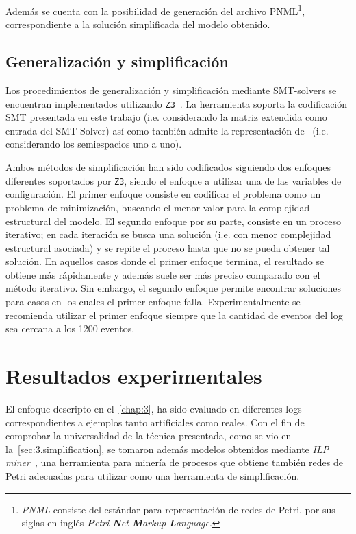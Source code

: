 Además se cuenta con la posibilidad de generación del archivo PNML\footnote{\textit{PNML} consiste del estándar para representación
de redes de Petri, por sus siglas en inglés \textit{\textbf{P}etri \textbf{N}et \textbf{M}arkup \textbf{L}anguage}.},
correspondiente a la solución simplificada del modelo obtenido.

\subsection{Generalización y simplificación}
\label{sec:4.simplification}

Los procedimientos de generalización y simplificación mediante SMT-solvers se encuentran implementados utilizando \texttt{Z3}~\cite{MouraB08}. 
La herramienta soporta la codificación SMT presentada en este trabajo (i.e. considerando la matriz extendida
como entrada del SMT-Solver) así como también admite la representación de~\cite{LeonCB15} (i.e. considerando los semiespacios uno a uno).

Ambos métodos de simplificación han sido codificados siguiendo dos enfoques diferentes soportados por \texttt{Z3},
siendo el enfoque a utilizar una de las variables de configuración.
El primer enfoque consiste en codificar el problema como un problema de minimización, buscando 
el menor valor para la complejidad estructural del modelo.
El segundo enfoque por su parte, consiste en un proceso iterativo; en cada iteración se busca
una  solución (i.e. con menor complejidad estructural asociada) y se repite el proceso
hasta que no se pueda obtener tal solución.
En aquellos casos donde el primer enfoque termina, el resultado se obtiene más rápidamente y además 
suele ser más preciso comparado con el método iterativo. Sin embargo, el segundo enfoque
permite encontrar soluciones para casos en los cuales el primer enfoque falla.
Experimentalmente se recomienda utilizar el primer enfoque siempre que la cantidad de eventos del log
sea cercana a los 1200 eventos.

\section{Resultados experimentales}
\label{sec:4.experiments}

El enfoque descripto en el~\autoref{chap:3}, ha sido evaluado en diferentes logs correspondientes
a ejemplos tanto artificiales como reales. Con el fin de comprobar la universalidad de la técnica presentada,
como se vio en la~\autoref{sec:3.simplification}, se tomaron además modelos obtenidos mediante \textit{ILP miner}~\cite{WDHS08},
una herramienta para minería de procesos que obtiene también redes de Petri adecuadas para utilizar \pachtool
como una herramienta de simplificación.

